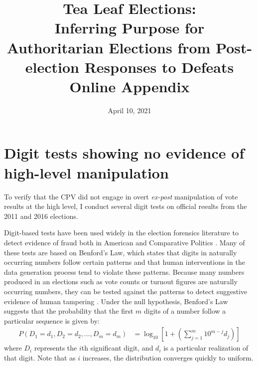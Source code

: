 \documentclass[12pt]{article}
\title{Tea Leaf Elections: \\
	Inferring Purpose for Authoritarian Elections from Post-election Responses to Defeats \\
	\vspace{2ex}
	Online Appendix}
\date{April 10, 2021}
\newcommand{\1}{\mathbbm{1}}
\renewcommand\r{\right}
\renewcommand\l{\left}
\begin{document}
	

\maketitle
\thispagestyle{empty}


\doublespacing

\newpage
{}

\tableofcontents
\newpage

\appendix

\section{Digit tests showing no evidence of high-level manipulation}
\label{app:benford}
To verify that the CPV did not engage in overt \textit{ex-post} manipulation of vote results at the high level, I conduct several digit tests on official results from the 2011 and 2016 elections. 

Digit-based tests have been used widely in the election forensics literature to detect evidence of fraud both in American \citep{Mebane2006} and Comparative Politics \citep{Mebane2009, Beber2012}. Many of these tests are based on Benford's Law, which states that digits in naturally occurring numbers follow certain patterns and that human interventions in the data generation process tend to violate these patterns. Because many numbers produced in an elections such as vote counts or turnout figures are naturally occurring numbers, they can be tested against the patterns to detect suggestive evidence of human tampering \citep{Mebane2006}. Under the null hypothesis, Benford's Law suggests that the probability that the first $m$ digits of a number follow a particular sequence is given by:
\begin{align*}
P(D_1=d_1, D_2=d_2, \dots, D_m=d_m) &= \log_{10}\l[1 + \l( \sum_{j=1}^{m}10^{m-j}d_j\r)\r]
\end{align*}
where $D_i$ represents the $i$th significant digit, and $d_i$ is a particular realization of that digit. 
Note that as $i$ increases, the distribution converges quickly to uniform.
\end{document}
